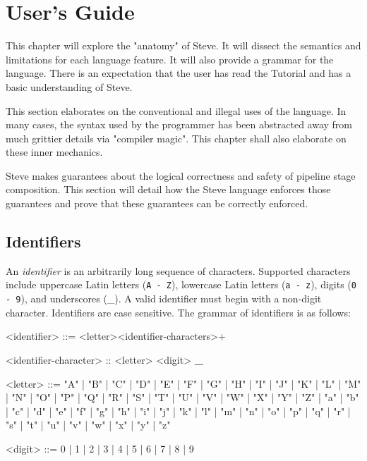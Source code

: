 \chapter{User's Guide} \label{ch:users_guide}

This chapter will explore the "anatomy" of Steve. It will dissect the semantics and limitations for each language feature. It will also provide a grammar for the language. There is an expectation that the user has read the Tutorial and has a basic understanding of Steve.

This section elaborates on the conventional and illegal uses of the language. In many cases, the syntax used by the programmer has been abstracted away from much grittier details via "compiler magic". This chapter shall also elaborate on these inner mechanics.

Steve makes guarantees about the logical correctness and safety of pipeline stage composition. This section will detail how the Steve language enforces those guarantees and prove that these guarantees can be correctly enforced.

\section{Identifiers} \label{guide:identifiers}

An \textit{identifier} is an arbitrarily long sequence of characters. Supported characters include uppercase Latin letters (\texttt{A - Z}), lowercase Latin letters (\texttt{a - z}), digits (\texttt{0 - 9}), and underscores (\_). A valid identifier must begin with a non-digit character. Identifiers are case sensitive. The grammar of identifiers is as follows:

\begin{minip}
\begin{grammar}
<identifier> ::= <letter><identifier-characters>+

<identifier-character> :: <letter>
\alt <digit>
\alt \textbf{\_}

<letter> ::= "A" | "B" | "C" | "D" | "E" | "F" | "G"
       | "H" | "I" | "J" | "K" | "L" | "M" | "N"
       | "O" | "P" | "Q" | "R" | "S" | "T" | "U"
       | "V" | "W" | "X" | "Y" | "Z" | "a" | "b"
       | "c" | "d" | "e" | "f" | "g" | "h" | "i"
       | "j" | "k" | "l" | "m" | "n" | "o" | "p"
       | "q" | "r" | "s" | "t" | "u" | "v" | "w"
       | "x" | "y" | "z"

<digit> ::= 0 | 1 | 2 | 3 | 4 | 5 | 6 | 7 | 8 | 9
\end{grammar}
\end{minip}

